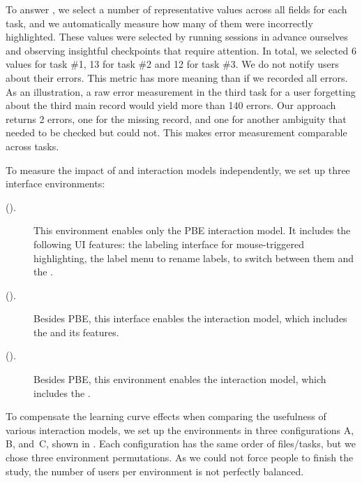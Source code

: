 To answer \RQOneShort, we select a number of representative values across all fields
for each task, and we automatically measure how many of them were incorrectly highlighted.
These values were selected by running \FlashProg sessions in advance
ourselves and observing insightful checkpoints that require attention.
In total, we selected 6 values for task \#1, 13 for task \#2 and 12 for task \#3.
We do not notify users about their errors.
This metric has more meaning than if we recorded all errors.
As an illustration, a raw error measurement in the third task for a user forgetting about the third main record would
yield more than 140 errors.
Our approach returns 2 errors, one for the missing record, and one for another ambiguity that needed to be checked but
could not.
This makes error measurement comparable across tasks.

To measure the impact of \ProgramNavigation and \ConversationalClarification interaction models
independently, we set up three interface environments:

\begin{description}
    \item[\BIdef (\BI).] This environment enables only the PBE interaction model.
        It includes the following UI features: the labeling interface for mouse-triggered highlighting, the
        label menu to rename labels, to switch between them and the \OutputTab.
    \item[\BIPWdef (\BIPW).] Besides PBE, this interface enables the
        \ProgramNavigation interaction model, which includes the \ProgramNavigationTab and its features.
    \item[\BIDTdef (\BIDT).] Besides PBE, this environment enables the
        \ConversationalClarification interaction model, which includes the \ConversationalClarificationTab.
\end{description}

To compensate the learning curve effects when comparing the usefulness of various interaction models, we set up the
environments in three configurations A, B, and~C, shown in .
Each configuration has the same order of files/tasks, but we chose three environment permutations.
As we could not force people to finish the study, the number of users per environment is not perfectly balanced.

